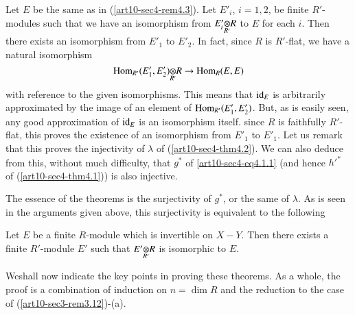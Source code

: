 Let $E$ be the same as in (\ref{art10-sec4-rem4.3}). Let $E'_{i}$, $i=1,2$, be finite $R'$-modules such that we have an isomorphism from $\foprod{E'_{i}}{R}{R'}$ to $E$ for each $i$. Then there exists an isomorphism from $E'_{1}$ to $E'_{2}$. In fact, since $R$ is $R'$-flat, we have a natural isomorphism
$$
\foprod{\Hom_{R'}(E'_{1},E'_{2})}{R}{R'}\to \Hom_{R}(E,E)
$$
with reference to the given isomorphisms. This means that $\operatorname{\mathrm{id}}_{E}$ is arbitrarily approximated by the image of an element of $\operatorname{\mathrm{Hom}}_{R'}(E'_{1},E'_{2})$. But, as is easily seen, any good approximation of $\operatorname{\mathrm{id}}_{E}$ is an isomorphism itself. since $R$ is faithfully $R'$-flat, this proves the existence of an isomorphism from $E'_{1}$ to $E'_{1}$. Let us remark that this proves the injectivity of $\lambda$ of (\ref{art10-sec4-thm4.2}). We can also deduce from this, without much difficulty, that $g^{*}$ of \eqref{art10-sec4-eq4.1.1} (and hence ${h'}^{*}$ of (\ref{art10-sec4-thm4.1})) is also injective.

The essence of the theorems is the surjectivity of $g^{*}$, or the same of $\lambda$. As is seen in the arguments given above, this surjectivity is equivalent to the following

\begin{theorem}\label{art10-sec4-thm4.4}
Let $E$ be a finite $R$-module which is invertible on $X-Y$. Then there exists a finite $R'$-module $E'$ such that $\foprod{E'}{R}{R'}$ is isomorphic to $E$.
\end{theorem}

We\pageoriginale shall now indicate the key points in proving these theorems. As a whole, the proof is a combination of induction on $n=\dim R$ and the reduction to the case of (\ref{art10-sec3-rem3.12})-(a).

